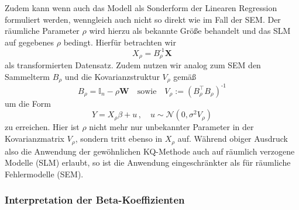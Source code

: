Zudem kann wenn auch das Modell als Sonderform der Linearen Regression formuliert werden, wenngleich auch 
nicht so direkt wie im Fall der SEM. Der räumliche Parameter $\rho$ wird hierzu 
als bekannte Größe
behandelt und das SLM auf gegebenes $\rho$ bedingt. Hierfür betrachten wir
\begin{equation*}
    X_{\rho}=B_{\rho}^{\text{-1}} \mathbf{X}
\end{equation*}
als transformierten Datensatz. Zudem nutzen wir analog zum SEM den Sammelterm $B_{\rho}$ und 
die Kovarianzstruktur $V_{\rho}$ gemäß
\begin{equation*}
    B_{\rho}=\mathds{I}_{n}-\rho \mathbf{W} \quad \text{sowie} \quad V_{\rho} := (B_{\rho}^{\top} B_{\rho})^{\text{-1}}
\end{equation*}
um die Form
\begin{equation}
    Y=X_{\rho} \beta + u \, , \quad u \sim \mathcal{N}(0,\sigma^{2} V_{\rho})
\end{equation}
zu erreichen. Hier ist $\rho$ nicht mehr nur unbekannter Parameter in der Kovarianzmatrix $V_{\rho}$, 
sondern tritt ebenso in $X_{\rho}$ auf. Während obiger Ausdruck also die Anwendung der 
gewöhnlichen KQ-Methode auch auf räumlich verzogene Modelle (SLM) erlaubt, so ist die Anwendung eingeschränkter als 
für räumliche Fehlermodelle (SEM).

\subsubsection{Interpretation der Beta-Koeffizienten}

